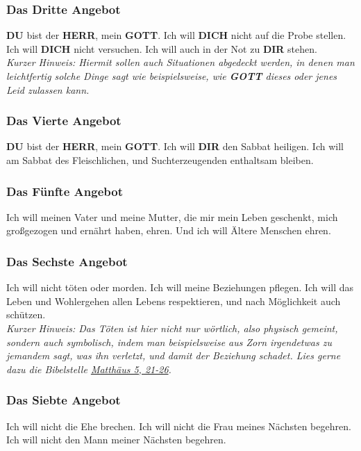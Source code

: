 \documentclass[10pt,a5paper]{article}
\newcommand{\Dich}[0]{\textbf{DICH}}
\newcommand{\Dir}[0]{\textbf{DIR}}
\newcommand{\Du}[0]{\textbf{DU}}
\newcommand{\Gott}[0]{\textbf{GOTT}}
\newcommand{\Herr}[0]{\textbf{HERR}}
\begin{document}
	\subsubsection{Das Dritte Angebot}
		{\Du} bist der {\Herr},
		mein {\Gott}.
		Ich will {\Dich} nicht auf die Probe stellen.
		Ich will {\Dich} nicht versuchen.
		Ich will auch in der Not zu {\Dir} stehen.
		\\
		\textit{Kurzer Hinweis:
		Hiermit sollen auch Situationen abgedeckt werden,
		in denen man leichtfertig solche Dinge sagt wie beispielsweise,
		wie {\Gott} dieses oder jenes Leid zulassen kann.}
		
	\subsubsection{Das Vierte Angebot}
		{\Du} bist der {\Herr},
		mein {\Gott}.
		Ich will {\Dir} den Sabbat heiligen.
		Ich will am Sabbat des Fleischlichen,
		und Suchterzeugenden enthaltsam bleiben.
		
	\subsubsection{Das F\"unfte Angebot}
		Ich will meinen Vater und meine Mutter,
		die mir mein Leben geschenkt,
		mich gro{\ss}gezogen und ern\"ahrt haben,
		ehren.
		Und ich will \"Altere Menschen ehren.
			
	\subsubsection{Das Sechste Angebot} \label{DasSechsteAngebot}
		Ich will nicht t\"oten oder morden.
		Ich will meine Beziehungen pflegen.
		Ich will das Leben und Wohlergehen allen Lebens respektieren,
		und nach M\"oglichkeit auch sch\"utzen.
		\\
		\textit{Kurzer Hinweis:
		Das T\"oten ist hier nicht nur w\"ortlich,
		also physisch gemeint,
		sondern auch symbolisch,
		indem man beispielsweise aus Zorn irgendetwas zu jemandem sagt,
		was ihn verletzt,
		und damit der Beziehung schadet.
		Lies gerne dazu die Bibelstelle \href{https://www.die-bibel.de/bibeln/online-bibeln/lesen/LU17/MAT.5/Matthäus-5}{Matthäus 5, 21-26}.}
		
	\subsubsection{Das Siebte Angebot}
		Ich will nicht die Ehe brechen.
		Ich will nicht die Frau meines N\"achsten begehren.
		Ich will nicht den Mann meiner N\"achsten begehren.
		
\end{document}
